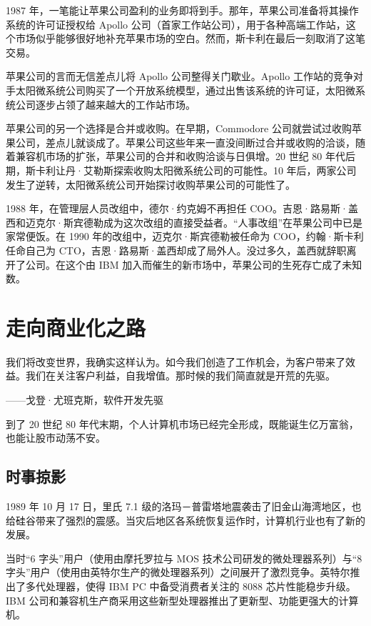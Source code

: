 \documentclass[12pt,UTF8]{ctexbook}
\begin{document}
1987 年，一笔能让苹果公司盈利的业务即将到手。那年，苹果公司准备将其操作系统的许可证授权给 Apollo 公司（首家工作站公司），用于各种高端工作站，这个市场似乎能够很好地补充苹果市场的空白。然而，斯卡利在最后一刻取消了这笔交易。

苹果公司的言而无信差点儿将 Apollo 公司整得关门歇业。Apollo 工作站的竞争对手太阳微系统公司购买了一个开放系统模型，通过出售该系统的许可证，太阳微系统公司逐步占领了越来越大的工作站市场。

苹果公司的另一个选择是合并或收购。在早期，Commodore 公司就尝试过收购苹果公司，差点儿就谈成了。苹果公司这些年来一直没间断过合并或收购的洽谈，随着兼容机市场的扩张，苹果公司的合并和收购洽谈与日俱增。20 世纪 80 年代后期，斯卡利让丹·艾勒斯探索收购太阳微系统公司的可能性。10 年后，两家公司发生了逆转，太阳微系统公司开始探讨收购苹果公司的可能性了。

1988 年，在管理层人员改组中，德尔·约克姆不再担任 COO。吉恩·路易斯·盖西和迈克尔·斯宾德勒成为这次改组的直接受益者。“人事改组”在苹果公司中已是家常便饭。在 1990 年的改组中，迈克尔·斯宾德勒被任命为 COO，约翰·斯卡利任命自己为 CTO，吉恩·路易斯·盖西却成了局外人。没过多久，盖西就辞职离开了公司。在这个由 IBM 加入而催生的新市场中，苹果公司的生死存亡成了未知数。





\section{走向商业化之路}


我们将改变世界，我确实这样认为。如今我们创造了工作机会，为客户带来了效益。我们在关注客户利益，自我增值。那时候的我们简直就是开荒的先驱。

——戈登·尤班克斯，软件开发先驱



到了 20 世纪 80 年代末期，个人计算机市场已经完全形成，既能诞生亿万富翁，也能让股市动荡不安。





\subsection{时事掠影}


1989 年 10 月 17 日，里氏 7.1 级的洛玛－普雷塔地震袭击了旧金山海湾地区，也给硅谷带来了强烈的震感。当灾后地区各系统恢复运作时，计算机行业也有了新的发展。

当时“6 字头”用户（使用由摩托罗拉与 MOS 技术公司研发的微处理器系列）与“8 字头”用户（使用由英特尔生产的微处理器系列）之间展开了激烈竞争。英特尔推出了多代处理器，使得 IBM PC 中备受消费者关注的 8088 芯片性能稳步升级。IBM 公司和兼容机生产商采用这些新型处理器推出了更新型、功能更强大的计算机。
\end{document}
